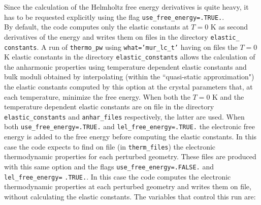 \documentclass[12pt,a4paper,twoside]{report}
\begin{document}
Since the calculation of the Helmholtz free energy derivatives is
quite heavy, it has to be requested explicitly using the flag 
\texttt{use\_free\_energy=.TRUE.}. \\
By default, the code computes only the elastic constants at $T=0$ K
as second derivatives of the energy and writes them on files in the 
directory \texttt{elastic\_} \texttt{constants}. A run of \texttt{thermo\_pw} using 
\texttt{what='mur\_lc\_t'} having on files the $T=0$ K elastic constants
in the directory \texttt{elastic\_constants}
allows the calculation of the anharmonic properties using temperature
dependent elastic constants and bulk moduli obtained by interpolating 
(within the ``quasi-static approximation") the elastic constants computed 
by this option at the crystal parameters that, at each temperature, 
minimize the free energy. 
When both the $T=0$ K and the temperature dependent elastic constants
are on file in the directory \texttt{elastic\_constants} and 
\texttt{anhar\_files} respectively, the latter are used.
When both \texttt{use\_free\_energy=.TRUE.} and
\texttt{lel\_free\_energy=.TRUE.} the electronic free energy is
added to the free energy before computing the elastic constants. In this case 
the code expects to find on file (in \texttt{therm\_files}) the electronic 
thermodynamic properties for each perturbed geometry. These files are
produced with this same option and the flags 
\texttt{use\_free\_energy=.FALSE.} and 
\texttt{lel\_free\_energy=} \texttt{.TRUE.}. In this case the code 
computes the electronic
thermodynamic properties at each perturbed geometry and writes them on 
file, without calculating the elastic constants.
The variables that control this run are:
\end{document}

